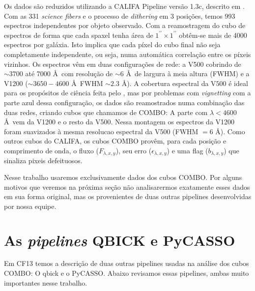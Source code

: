 Os dados são reduzidos utilizando a CALIFA Pipeline versão 1.3c, descrito em \citet[][ap. A]{Husemann2013}. Com as 331
{\em science fibers} e o processo de {\em dithering} em 3 posições, temos 993 espectros independentes por objeto
observado. Com a reamostragem do cubo de espectros de forma que cada spaxel tenha área de $1^{\prime\prime} \times
1^{\prime\prime}$ obtêm-se mais de 4000 espectros por galáxia. Isto implica que cada píxel do cubo final não seja
completamente independente, ou seja, numa automática correlação entre os píxeis vizinhos. Os espectros vêm em duas
configurações de rede: a V500 cobrindo de $\sim 3700$ até 7000 \AA\ com resolução de $\sim 6$ \AA\ de largura à meia
altura (FWHM) e a V1200 ($\sim 3650-4600$ \AA\ FWHM $\sim2.3$ \AA). A cobertura espectral da V$500$ é ideal para os
propósitos de ciência feita pelo \starlight, mas por problemas com {\em vignetting} com a parte azul dessa configuração,
os dados são reamostrados numa combinação das duas redes, criando cubos que chamamos de COMBO: A parte com $\lambda <
4600$ \AA\ vem da V1200 e o resto da V500. Nessa montagem os espectros da V1200 foram suavizados à mesma resolucao
espectral da V500 (FWHM $= 6$ \AA). Como outros cubos do CALIFA, os cubos COMBO provêm, para cada posição e comprimento
de onda, o fluxo ($F_{\lambda,x,y}$), seu erro ($\epsilon_{\lambda,x,y}$) e uma flag ($b_{\lambda,x,y}$) que sinaliza
pixeis defeituosos.

Nesse trabalho usaremos exclusivamente dados dos cubos COMBO. Por alguns motivos que veremos na próxima seção não
analisarermos exatamente esses dados em sua forma original, mas os provenientes de duas outras pipelines desenvolvidas
por nossa equipe.


\section{As {\em pipelines} QBICK e PyCASSO}
\label{sec:CALePyC:pipelines}

Em CF13 temos a descrição de duas outras pipelines usadas na análise dos cubos COMBO: O {\sc qbick} e o PyCASSO. Abaixo
revisamos essas pipelines, ambas muito importantes nesse trabalho.

